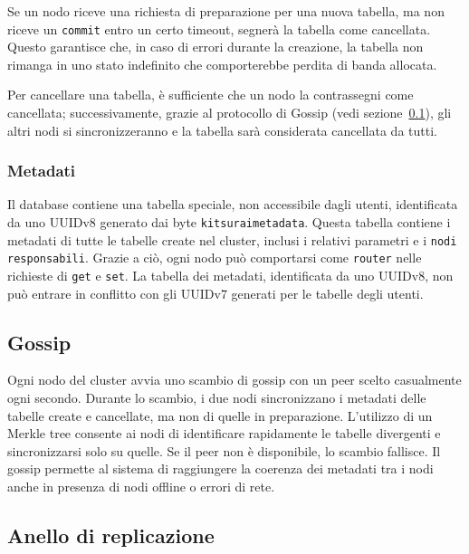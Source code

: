 
Se un nodo riceve una richiesta di preparazione per una nuova tabella, ma non riceve un \texttt{commit} entro un certo timeout, segnerà la tabella come cancellata.
Questo garantisce che, in caso di errori durante la creazione, la tabella non rimanga in uno stato indefinito che comporterebbe perdita di banda allocata.

Per cancellare una tabella, è sufficiente che un nodo la contrassegni come cancellata; successivamente, grazie al protocollo di Gossip (vedi sezione~\ref{subsec:gossip}), gli altri nodi si sincronizzeranno e la tabella sarà considerata cancellata da tutti.

\subsubsection{Metadati}
\label{subsubsec:metadati}

Il database contiene una tabella speciale, non accessibile dagli utenti, identificata da uno UUIDv8 generato dai byte \texttt{kitsuraimetadata}.
Questa tabella contiene i metadati di tutte le tabelle create nel cluster, inclusi i relativi parametri e i \texttt{nodi responsabili}.
Grazie a ciò, ogni nodo può comportarsi come \texttt{router} nelle richieste di \texttt{get} e \texttt{set}.
La tabella dei metadati, identificata da uno UUIDv8, non può entrare in conflitto con gli UUIDv7 generati per le tabelle degli utenti.

\subsection{Gossip}
\label{subsec:gossip}

Ogni nodo del cluster avvia uno scambio di gossip con un peer scelto casualmente ogni secondo.
Durante lo scambio, i due nodi sincronizzano i metadati delle tabelle create e cancellate, ma non di quelle in preparazione.
L'utilizzo di un Merkle tree consente ai nodi di identificare rapidamente le tabelle divergenti e sincronizzarsi solo su quelle.
Se il peer non è disponibile, lo scambio fallisce.
Il gossip permette al sistema di raggiungere la coerenza dei metadati tra i nodi anche in presenza di nodi offline o errori di rete.

\subsection{Anello di replicazione}
\label{subsec:anello-replicazione}


